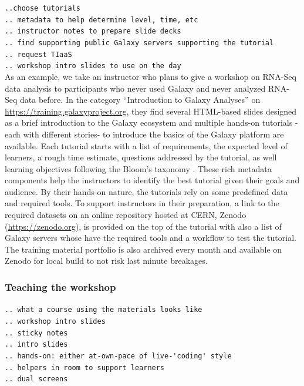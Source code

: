 \documentclass[10pt,letterpaper]{article}
\begin{document}
\verb+..choose tutorials+ \\
\verb+.. metadata to help determine level, time, etc+ \\
\verb+.. instructor notes to prepare slide decks+ \\
\verb+.. find supporting public Galaxy servers supporting the tutorial+ \\
\verb+.. request TIaaS+ \\
\verb+.. workshop intro slides to use on the day+ \\


As an example, we take an instructor who plans to give a workshop on RNA-Seq data analysis to participants who never used Galaxy and never analyzed RNA-Seq data before.
In the category “Introduction to Galaxy Analyses” on \url{https://training.galaxyproject.org}, they find several HTML-based slides designed as a brief introduction to the Galaxy ecosystem and multiple hands-on tutorials -each with different stories- to introduce the basics of the Galaxy platform are available.
Each tutorial starts with a list of requirements, the expected level of learners, a rough time estimate, questions addressed by the tutorial, as well learning objectives following the Bloom’s taxonomy \cite{TODO}.
These rich metadata components help the instructors to identify the best tutorial given their goals and audience.
By their hands-on nature, the tutorials rely on some predefined data and required tools.
To support instructors in their preparation, a link to the required datasets on an online repository hosted at CERN, Zenodo (\url{https://zenodo.org}), is provided on the top of the tutorial with also a list of Galaxy servers whose have the required tools and a workflow to test the tutorial.
The training material portfolio is also archived every month and available on Zenodo for local build to not risk last minute breakages.

\subsubsection*{Teaching the workshop}

\verb+.. what a course using the materials looks like+ \\
\verb+.. workshop intro slides+ \\
\verb+.. sticky notes+ \\
\verb+.. intro slides+ \\
\verb+.. hands-on: either at-own-pace of live-'coding' style+ \\
\verb+.. helpers in room to support learners+ \\
\verb+.. dual screens+ \\
\end{document}
